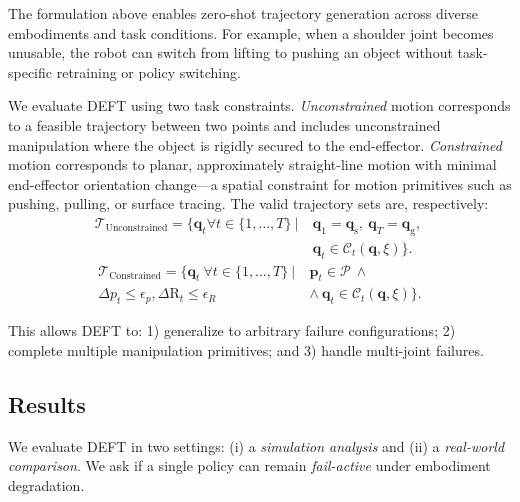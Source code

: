 \label{sec:failures:unified}
The formulation above enables zero-shot trajectory generation across diverse embodiments and task conditions. For example, when a shoulder joint becomes unusable, the robot can switch from lifting to pushing an object without task-specific retraining or policy switching.

We evaluate DEFT using two task constraints. \textit{Unconstrained} motion corresponds to a feasible trajectory between two points and includes unconstrained manipulation where the object is rigidly secured to the end-effector. \textit{Constrained} motion corresponds to planar, approximately straight-line motion with minimal end-effector orientation change---a spatial constraint for motion primitives such as pushing, pulling, or surface tracing. The valid trajectory sets are, respectively:
\begin{equation}
\begin{aligned}
  \mathcal{T}_\text{Unconstrained}=\Big\{\mathbf{q}_t \forall t\in\{1,\dots,T\}\ \Big|\
  & \mathbf{q}_1=\mathbf{q}_\text{s},\  \mathbf{q}_T=\mathbf{q}_\text{g},\ \\
  & \mathbf{q}_t\in \mathcal{C}_t(\mathbf{q},\xi)\Big\}.
\end{aligned}
\end{equation}
\begin{equation}
\begin{aligned}
  \mathcal{T}_\text{Constrained}
  = \Big\{\mathbf{q}_{t}\ \forall t\in\{1,\dots,T\}\ \Big|\ &
  \mathbf{p}_t\in\mathcal{P}\ \land\ \\ \Delta p_t\le \epsilon_p,
   \Delta \mathrm{R}_t\le \epsilon_R\ & \land\ \mathbf{q}_t\in \mathcal{C}_t(\mathbf{q},\xi)
  \Big\}.
\end{aligned}
\end{equation}

This allows \textsc{DEFT} to: 1) generalize to arbitrary failure configurations; 2) complete multiple manipulation primitives; and 3) handle multi-joint failures.

\subsection{Results}
\label{sec:failures:comparison}

We evaluate DEFT in two settings: (i) a \emph{simulation analysis} and (ii) a \emph{real-world comparison}. We ask if a single policy can remain \emph{fail-active} under embodiment degradation.

